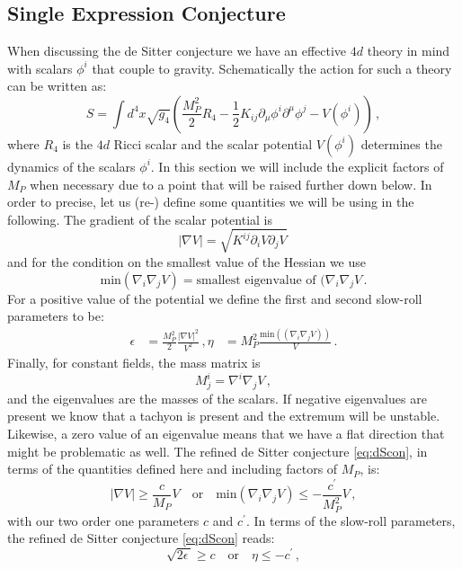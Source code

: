 \documentclass[12pt]{report}
\newcommand{\be}{\begin{equation}}
\newcommand{\ee}{\end{equation}}
\newcommand{\bea}{\begin{equation}\begin{aligned}}
\newcommand{\eea}{\end{aligned}\end{equation}}
\begin{document}
\subsection{Single Expression Conjecture}
When discussing the de Sitter conjecture we have an effective $4d$ theory in mind with scalars $\phi^ i$ that couple to gravity. Schematically the action for such a theory can be written as:
\be 
S = \int d^4x \sqrt{g_4} \left(\frac{M_P^ 2}{2} R_4 - \frac{1}{2} K_{ij} \partial_\mu \phi^ i \partial^ \mu \phi^ j - V(\phi^ i)\right)\,,
\label{eq:leeact}
\ee
where $R_4$ is the $4d$ Ricci scalar and the scalar potential $V(\phi^ i)$ determines the dynamics of the scalars $\phi^ i$. In this section we will include the explicit factors of $M_P$ when necessary due to a point that will be raised further down below. In order to precise, let us (re-) define some quantities we will be using in the following. The gradient of the scalar potential is
\be 
|\nabla V| = \sqrt{K^{ij}\partial_i V \partial_j V}\,
\ee
and for the condition on the smallest value of the Hessian we use
\be 
\text{min}(\nabla_i \nabla_j V) = \text{smallest eigenvalue of }(\nabla_i \nabla_j V\,.
\ee
For a positive value of the potential we define the first and second slow-roll parameters to be:
\bea 
\epsilon &= \frac{M_P^ 2}{2} \frac{|\nabla V|^2}{V^2}\,,
\eta &= M_P^ 2 \frac{\text{min}((\nabla_i \nabla_j V))}{V}\,.
\eea
Finally, for constant fields, the mass matrix is
\be
M^i_j= \nabla^i \nabla_j V\,,
\ee
and the eigenvalues are the masses of the scalars. If negative eigenvalues are present we know that a tachyon is present and the extremum will be unstable. Likewise, a zero value of an eigenvalue means that we have a flat direction that might be problematic as well. The refined de Sitter conjecture \eqref{eq:dScon}, in terms of the quantities defined here and including factors of $M_P$, is:
\be 
|\nabla V| \geq \frac{c}{M_P} V \quad \text{or} \quad \text{min}(\nabla_i \nabla_j V) \leq - \frac{c^ \prime}{M_P^ 2} V\,,
\label{eq:dSconMP}
\ee
with our two order one parameters $c$ and $c^ \prime$. In terms of the slow-roll parameters, the refined de Sitter conjecture \eqref{eq:dScon} reads:
\be 
\sqrt{2 \epsilon \,} \geq c \quad \text{or} \quad \eta \leq - c^\prime\,,
\ee
\end{document}
